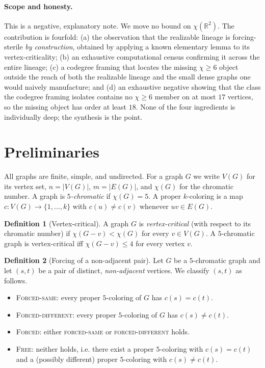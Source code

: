 \documentclass[11pt]{article}
\theoremstyle{definition}
\newtheorem{definition}{Definition}
\newcommand{\R}{\mathbb{R}}
\newcommand{\chrom}{\chi}
\begin{document}
\paragraph{Scope and honesty.} This is a negative, explanatory note. We move no
bound on $\chrom(\R^2)$. The contribution is fourfold: (a) the observation that
the realizable lineage is forcing-sterile \emph{by construction}, obtained by
applying a known elementary lemma to its vertex-criticality; (b) an exhaustive
computational census confirming it across the entire lineage;
(c) a codegree framing that locates the missing $\chrom \ge 6$ object outside the
reach of both the realizable lineage and the small dense graphs one would
naively manufacture; and (d) an exhaustive negative showing that the class
the codegree framing isolates contains no $\chrom \ge 6$ member on at most $17$
vertices, so the missing object has order at least $18$. None of the four
ingredients is individually deep; the synthesis is the point.

\section{Preliminaries}
\label{sec:prelim}

All graphs are finite, simple, and undirected. For a graph $G$ we write $V(G)$
for its vertex set, $n = |V(G)|$, $m = |E(G)|$, and $\chrom(G)$ for the chromatic
number. A graph is \emph{$5$-chromatic} if $\chrom(G) = 5$. A proper
$k$-coloring is a map $c : V(G) \to \{1, \dots, k\}$ with $c(u) \ne c(v)$ whenever
$uv \in E(G)$.

\begin{definition}[Vertex-critical]
A graph $G$ is \emph{vertex-critical} (with respect to its chromatic number) if
$\chrom(G - v) < \chrom(G)$ for every $v \in V(G)$. A $5$-chromatic graph is
vertex-critical iff $\chrom(G - v) \le 4$ for every vertex $v$.
\end{definition}

\begin{definition}[Forcing of a non-adjacent pair]
\label{def:forcing}
Let $G$ be a $5$-chromatic graph and let $(s,t)$ be a pair of distinct,
\emph{non-adjacent} vertices. We classify $(s,t)$ as follows.
\begin{itemize}
  \item \textsc{Forced-same}: every proper $5$-coloring of $G$ has $c(s) = c(t)$.
  \item \textsc{Forced-different}: every proper $5$-coloring of $G$ has
        $c(s) \ne c(t)$.
  \item \textsc{Forced}: either \textsc{forced-same} or \textsc{forced-different}
        holds.
  \item \textsc{Free}: neither holds, i.e. there exist a proper $5$-coloring with
        $c(s) = c(t)$ and a (possibly different) proper $5$-coloring with
        $c(s) \ne c(t)$.
\end{itemize}
\end{definition}
\end{document}

